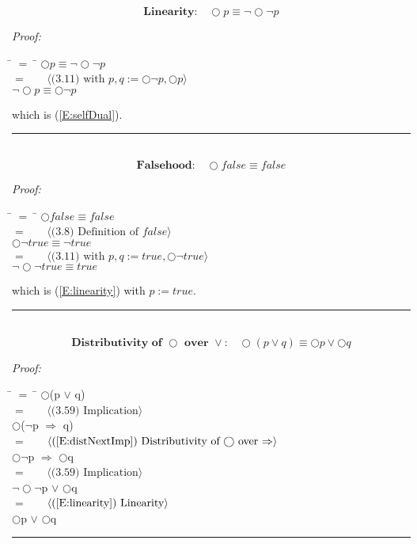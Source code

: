 \documentclass[fleqn, leqno]{article}
\newcommand{\lgap}{2pt}                             %
\newcommand{\mymathindent}{24pt}                      %
\newcommand{\next}{\bigcirc}
\newcommand{\myqed}{\hfill\rule[-.23ex]{1.2ex}{2.0ex}}
\newcommand{\Gll} {\langle}                         %
\newcommand{\Ggg} {\rangle}                         %
\newcommand{\Hint}[1]     {\ \ \ $\Gll              \mbox{#1} \Ggg$ }   %
\begin{document}
\begin{equation}\label{E:linearity}
\textbf{Linearity:}\quad \next p \equiv \lnot\next\lnot p
\end{equation}

\emph{Proof:}
\begin{tabbing}
\hspace{\mymathindent} \= $= \;$ \= \kill
  \> \>   $\next p \equiv \lnot\next\lnot p$\\[\lgap]
  \> $=$  \>  \Hint{(3.11) with $p,q := \next\lnot p, \next p$} \\[\lgap]
  \> \>   $\lnot\next p \equiv \next\lnot p$
\end{tabbing}
which is (\ref{E:selfDual}). \myqed\\[\lgap]


\begin{equation}\label{E:nextFalse}
\textbf{Falsehood:}\quad \next false \equiv false
\end{equation}

\emph{Proof:}
\begin{tabbing}
\hspace{\mymathindent} \= $= \;$ \= \kill
  \> \>   $\next false \equiv false$\\[\lgap]
  \> $=$  \>  \Hint{(3.8) Definition of $false$} \\[\lgap]
  \> \>   $\next\lnot true \equiv \lnot true$\\[\lgap]
  \> $=$  \>  \Hint{(3.11) with $p,q := true, \next\lnot true$}\\[\lgap]
  \> \>   $\lnot\next\lnot true \equiv true$\\[\lgap]
\end{tabbing}
which is (\ref{E:linearity}) with $p := true$. \myqed\\[\lgap]


\begin{equation}\label{E:distNextOr}
\textbf{Distributivity of $\next$ over $\lor$:}\quad \next (p \lor q) \equiv \next p \lor \next q
\end{equation}


\emph{Proof:}
\begin{tabbing}
\hspace{\mymathindent} \= $= \;$ \= \kill
	\> \>   $\next$(p $\lor$ q)\\[\lgap]
	\> $=$  \>  \Hint{(3.59) Implication}\\[\lgap]
	\> \>   $\next$($\lnot$p $\Rightarrow$ q)\\[\lgap]
	\> $=$  \>  \Hint{(\ref{E:distNextImp}) Distributivity of $\next$ over $\Rightarrow$}\\[\lgap]
	\> \>   $\next\lnot$p $\Rightarrow$ $\next$q\\[\lgap]
	\> $=$  \>  \Hint{(3.59) Implication}\\[\lgap]
	\> \>   $\lnot\next\lnot$p $\lor$ $\next$q\\[\lgap]
	\> $=$  \>  \Hint{(\ref{E:linearity}) Linearity}\\[\lgap]
	\> \>   $\next$p $\lor$ $\next$q
\end{tabbing}
\myqed\\[\lgap]
\end{document}
